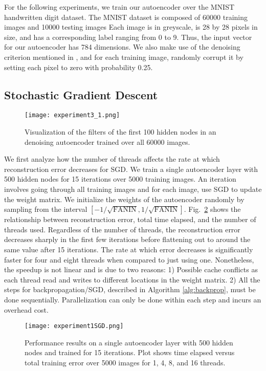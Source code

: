 \FloatBarrier

For the following experiments, we train our autoencoder over the MNIST handwritten digit
dataset. The MNIST dataset is composed of 60000 training images and 10000
testing images Each image is in greyscale, is 28 by 28 pixels in size, and has
a corresponding label ranging from 0 to 9. Thus, the input vector for our
autoencoder has 784 dimensions. We also make use of the denoising criterion
mentioned in \cite{vincent2010stacked}, and for each training image, randomly
corrupt it by setting each pixel to zero with probability 0.25.

\subsection{Stochastic Gradient Descent}

\begin{figure}[h] \centering
	\texttt{[image: experiment3\_1.png]}
	\caption{Visualization of the filters of the first 100 hidden nodes in an
	denoising autoencoder trained over all 60000 images.}
	\label{fig:experiment3_1}
\end{figure}

We first analyze how the number of threads affects the rate at which reconstruction
error decreases for SGD. We train a single autoencoder layer with 500 hidden nodes for
15 iterations over 5000 training images. An iteration involves going through
all training images and for each image, use SGD to update the weight matrix. We initialize the weights of the autoencoder randomly by sampling from the interval $[-1/\sqrt{\text{FANIN}}, 1/\sqrt{\text{FANIN}}]$.
Fig.~\ref{fig:experiment1} shows the relationship between reconstruction error, total
time elapsed, and the number of threads used. Regardless of the number of
threads, the reconstruction error decreases sharply in the first few iterations
before flattening out to around the same value after 15 iterations. The rate at
which error decreases is significantly faster for four and eight threads when
compared to just using one. Nonetheless, the speedup is not linear and is due
to two reasons: 1) Possible cache conflicts as each thread read and writes to
different locations in the weight matrix. 2) All the steps for
backpropagation/SGD, described in Algorithm \ref{alg:backprop}, must be done
sequentially. Parallelization can only be done within each step and incurs an
overhead cost.

\begin{figure}[h]
\centering
\texttt{[image: experiment1SGD.png]}
\caption{Performance results on a single autoencoder layer with 500 hidden nodes and trained for 15 iterations. Plot shows time elapsed versus total training error over 5000 images for 1, 4, 8, and 16 threads.}
\label{fig:experiment1}
\end{figure}


